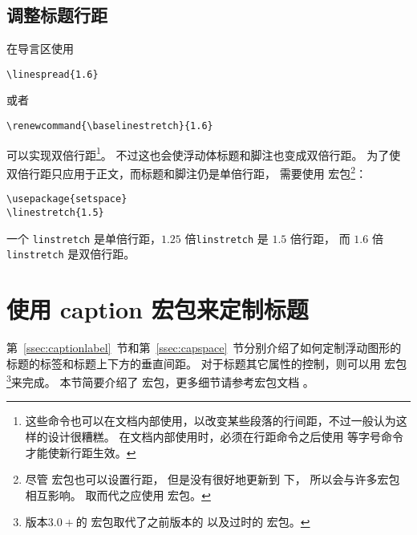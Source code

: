 \subsection{调整标题行距}\label{ssec:caplinspacing}

在导言区使用
\begin{lstlisting}
\linespread{1.6}
\end{lstlisting}
或者
\begin{lstlisting}
\renewcommand{\baselinestretch}{1.6}
\end{lstlisting}
可以实现双倍行距\footnote{
	这些命令也可以在文档内部使用，以改变某些段落的行间距，不过一般认为这样的设计很糟糕。
	在文档内部使用时，必须在行距命令之后使用  等字号命令才能使新行距生效。}。
不过这也会使浮动体标题和脚注也变成双倍行距。
为了使双倍行距只应用于正文，而标题和脚注仍是单倍行距，
需要使用  宏包\footnote{
	尽管  宏包也可以设置行距，
	但是没有很好地更新到 \LaTeXe{} 下，
	所以会与许多宏包相互影响。
	取而代之应使用  宏包。}：
\begin{lstlisting}
\usepackage{setspace}
\linestretch{1.5}
\end{lstlisting}
一个 \texttt{linstretch} 是单倍行距，$1.25$ 倍\texttt{linstretch} 是 $1.5$ 倍行距，
而 $1.6$ 倍 \texttt{linstretch} 是双倍行距。


\section{使用 caption 宏包来定制标题}\label{sec:caption-pkg}

第~\ref{ssec:captionlabel}~节和第~\ref{ssec:capspace}~节分别介绍了如何定制浮动图形的标题的标签和标题上下方的垂直间距。
对于标题其它属性的控制，则可以用  宏包\footnote{%
	版本$3.0+$的  宏包取代了之前版本的  以及过时的  宏包。}来完成。
本节简要介绍了  宏包，更多细节请参考宏包文档 \cite{caption-doc}。

